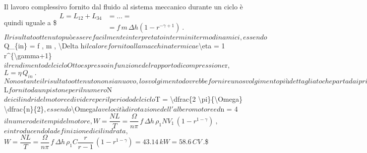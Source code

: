 \documentclass[letterpaper,10pt,italian]{jupyterBook}
\begin{document}
\sphinxAtStartPar
Il lavoro complessivo fornito dal fluido al sistema meccanico durante un
ciclo è quindi uguale a \$\(\begin{aligned}
 L = L_{12} + L_{34} & = \dots = \\
 & = f \, m \, \Delta h \left( 1 - r^{-\gamma+1}\right)  \ .
\end{aligned}\)\( Il risultato ottenuto può essere facilmente interpretato
in termini termodinamici, essendo \)Q\_\{in\} = f , m , \textbackslash{}Delta h\( il
calore fornito alla macchina termica e \)\textbackslash{}eta = 1 \sphinxhyphen{} r\textasciicircum{}\{\sphinxhyphen{}\textbackslash{}gamma+1\}\( il
rendimento del ciclo Otto espresso in funzione del rapporto di
compressione \)r\(, \)\(L = \eta \, Q_{in} \ .\)\( Nonostante il risultato
ottenuto non sia nuovo, lo svolgimento dovrebbe fornire uno svolgimento
più dettagliato che parta dai principi fisici, rappresentati dai bilanci
integrali, ed evidenziare il ruolo delle ipotesi fatte per ricavare il
risultato, come ad esempio l'assenza di flussi di calore durante la fase
di compressione e espansione adiabatica. Per ottenere la potenza media
fornita dal motore, bisogna moltiplicare il lavoro \)L\( fornito da un
pistone per il numero \)N\( dei cilindri del motore e dividere per il
periodo del ciclo \)T = \textbackslash{}dfrac\{2 \textbackslash{}pi\}\{\textbackslash{}Omega\} \textbackslash{}dfrac\{n\}\{2\}\(, essendo
\)\textbackslash{}Omega\( la velocità di rotazione dell'albero motore ed \)n = 4\( il
numero dei tempi del motore,
\)\(W = \dfrac{N L}{T} = \dfrac{\Omega }{n \pi} \, f \, \Delta h \, \rho_1 N V_1 \, \left( 1 - r^{1-\gamma} \right) \ ,\)\(
e introducendo la definizione di cilindrata,
\)\(W = \dfrac{N L}{T} = \dfrac{\Omega }{n \pi} \, f \, \Delta h \, \rho_1 C \dfrac{r}{r-1} \, \left( 1 - r^{1-\gamma} \right) = 43.14 \, kW = 58.6 \, CV \ .\)\$

\sphinxstepscope
\end{document}
